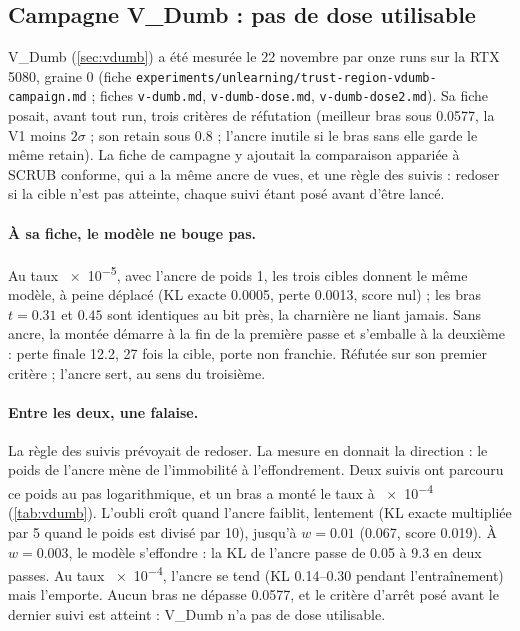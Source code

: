 \documentclass[11pt,a4paper]{article}
\newcommand{\chemin}[1]{\nolinkurl{#1}}%
\begin{document}
\subsection{Campagne V\_Dumb : pas de dose utilisable}\label{sec:campagnevdumb}
V\_Dumb (\cref{sec:vdumb}) a été mesurée le 22 novembre par onze runs sur la RTX 5080, graine 0 (fiche
\chemin{experiments/unlearning/trust-region-vdumb-campaign.md} ; fiches \chemin{v-dumb.md},
\chemin{v-dumb-dose.md}, \chemin{v-dumb-dose2.md}). Sa fiche posait, avant tout run, trois critères de
réfutation (meilleur bras sous \num{0.0577}, la V1 moins $2\sigma$ ; son retain sous \num{0.8} ; l'ancre
inutile si le bras sans elle garde le même retain). La fiche de campagne y ajoutait la comparaison
appariée à SCRUB conforme, qui a la même ancre de vues, et une règle des suivis : redoser si la cible
n'est pas atteinte, chaque suivi étant posé avant d'être lancé.

\paragraph{À sa fiche, le modèle ne bouge pas.} Au taux \num{e-5}, avec l'ancre de poids 1, les trois
cibles donnent le même modèle, à peine déplacé (KL exacte \num{0.0005}, perte \num{0.0013}, score
nul) ; les bras $t=\num{0.31}$ et $\num{0.45}$ sont identiques au bit près, la charnière ne liant
jamais. Sans ancre, la montée démarre à la fin de la première passe et s'emballe à la deuxième : perte
finale \num{12.2}, 27 fois la cible, porte non franchie. Réfutée sur son premier critère ; l'ancre
sert, au sens du troisième.

\paragraph{Entre les deux, une falaise.} La règle des suivis prévoyait de redoser. La mesure en
donnait la direction : le poids de l'ancre mène de l'immobilité à l'effondrement. Deux suivis ont
parcouru ce poids au pas logarithmique, et un bras a monté le taux à \num{e-4} (\cref{tab:vdumb}).
L'oubli croît quand l'ancre faiblit, lentement (KL exacte multipliée par 5 quand le poids est divisé par
10), jusqu'à $w=\num{0.01}$ (\num{0.067}, score \num{0.019}). À $w=\num{0.003}$, le modèle s'effondre :
la KL de l'ancre passe de \num{0.05} à \num{9.3} en deux passes. Au taux \num{e-4}, l'ancre se tend (KL
\numrange{0.14}{0.30} pendant l'entraînement) mais l'emporte. Aucun bras ne dépasse \num{0.0577}, et le
critère d'arrêt posé avant le dernier suivi est atteint : V\_Dumb n'a pas de dose utilisable.
\end{document}
